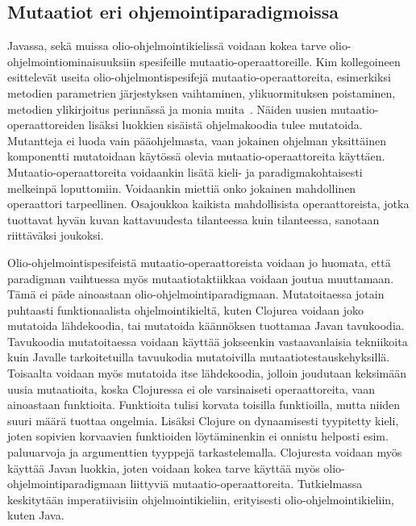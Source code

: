 \documentclass[finnish]{tktltiki2}
\begin{document}
\subsection{Mutaatiot eri ohjemointiparadigmoissa}
Javassa, sekä muissa olio-ohjelmointikielissä voidaan kokea tarve olio-ohjelmointiominaisuuksiin spesifeille mutaatio-operaattoreille. Kim kollegoineen esittelevät useita olio-ohjelmontispesifejä mutaatio-operaattoreita, esimerkiksi metodien parametrien järjestyksen vaihtaminen, ylikuormituksen poistaminen, metodien ylikirjoitus perinnässä ja monia muita~\cite{KimCM00}. Näiden uusien mutaatio-operaattoreiden lisäksi luokkien sisäistä ohjelmakoodia tulee mutatoida. Mutantteja ei luoda vain pääohjelmasta, vaan jokainen ohjelman yksittäinen komponentti mutatoidaan käytössä olevia mutaatio-operaattoreita käyttäen. Mutaatio-operaattoreita voidaankin lisätä kieli- ja paradigmakohtaisesti melkeinpä loputtomiin. Voidaankin miettiä onko jokainen mahdollinen operaattori tarpeellinen. Osajoukkoa kaikista mahdollisista operaattoreista, jotka tuottavat hyvän kuvan kattavuudesta tilanteessa kuin tilanteessa, sanotaan riittäväksi joukoksi.

Olio-ohjelmointispesifeistä mutaatio-operaattoreista voidaan jo huomata, että paradigman vaihtuessa myös mutaatiotaktiikkaa voidaan joutua muuttamaan. Tämä ei päde ainoastaan olio-ohjelmointiparadigmaan. Mutatoitaessa jotain puhtaasti funktionaalista ohjelmointikieltä, kuten Clojurea voidaan joko mutatoida lähdekoodia, tai mutatoida käännöksen tuottamaa Javan tavukoodia. Tavukoodia mutatoitaessa voidaan käyttää jokseenkin vastaavanlaisia tekniikoita kuin Javalle tarkoitetuilla tavuukodia mutatoivilla mutaatiotestauskehyksillä. Toisaalta voidaan myös mutatoida itse lähdekoodia, jolloin joudutaan keksimään uusia mutaatioita, koska Clojuressa ei ole varsinaiseti operaattoreita, vaan ainoastaan funktioita. Funktioita tulisi korvata toisilla funktioilla, mutta niiden suuri määrä tuottaa ongelmia. Lisäksi Clojure on dynaamisesti tyypitetty kieli, joten sopivien korvaavien funktioiden löytäminenkin ei onnistu helposti esim. paluuarvoja ja argumenttien tyyppejä tarkastelemalla. Clojuresta voidaan myös käyttää Javan luokkia, joten voidaan kokea tarve käyttää myös olio-ohjelmointiparadigmaan liittyviä mutaatio-operaattoreita. Tutkielmassa keskitytään imperatiivisiin ohjelmointikieliin, erityisesti olio-ohjelmointikieliin, kuten Java.
\end{document}
